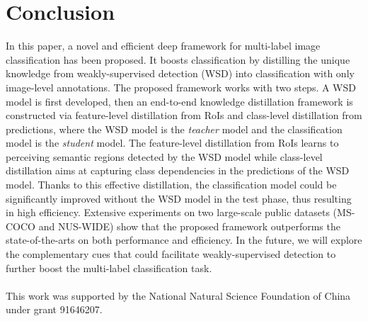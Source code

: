 \documentclass[sigconf,natbib=false]{acmart}
\begin{document}
\vspace{+5pt}
\section{Conclusion}

In this paper, a novel and efficient deep framework for multi-label image classification has been proposed. It boosts classification by distilling the unique knowledge from weakly-supervised detection (WSD) into classification with only image-level annotations. The proposed framework works with two steps. A WSD model is first developed, then an end-to-end knowledge distillation framework is constructed via feature-level distillation from RoIs and class-level distillation from predictions, where the WSD model is the \emph{teacher} model and the classification model is the \emph{student} model. The feature-level distillation from RoIs learns to perceiving semantic regions detected by the WSD model while class-level distillation aims at capturing class dependencies in the predictions of the WSD model. Thanks to this effective distillation, the classification model could be significantly improved without the WSD model in the test phase, thus resulting in high efficiency. Extensive experiments on two large-scale public datasets (MS-COCO and NUS-WIDE) show that the proposed framework outperforms the state-of-the-arts on both performance and efficiency. In the future, we will explore the complementary cues that could facilitate weakly-supervised detection to further boost the multi-label classification task.
\vspace{+17pt}
\\
\\
This work was supported by the National Natural Science Foundation of China under grant 91646207.  
\printbibliography
\end{document}
